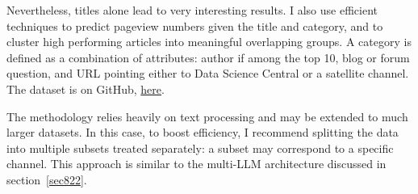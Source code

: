 \documentclass[oneside,10pt]{book}
\begin{document}
Nevertheless, titles alone lead to very interesting results.
 I also use efficient techniques to predict pageview numbers given the title and category, and to cluster high performing articles  into meaningful overlapping groups.  
A category is defined as a combination of attributes: author if among the top 10, blog or forum question, and URL pointing either to Data Science Central or a satellite channel. The dataset is on GitHub, \href{https://github.com/VincentGranville/Statistical-Optimization/blob/main/Articles-Pageviews.txt}{here}.

The methodology relies heavily on text processing and may be extended to much larger datasets. In this case, to boost efficiency, I recommend splitting the data into
 multiple subsets treated separately: a subset may correspond to a specific channel. This approach is similar to the multi-LLM architecture discussed 
 in section~\ref{sec822}. 
\end{document}
